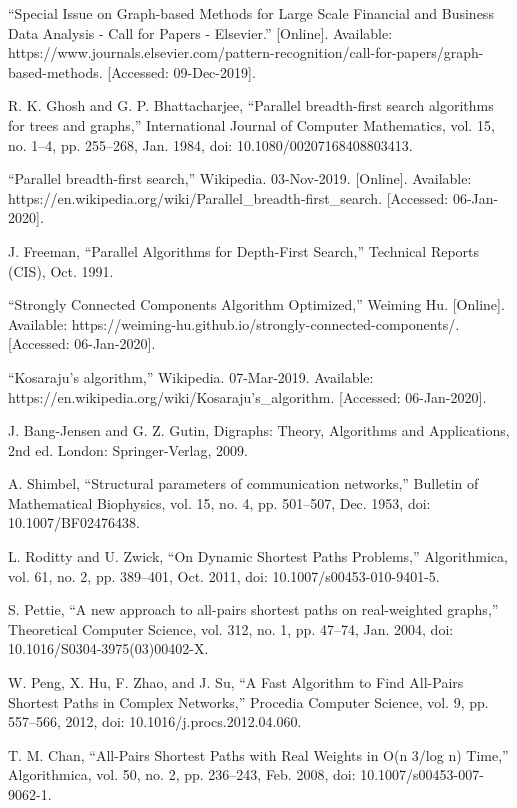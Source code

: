 \documentclass[journal,twoside,web]{ieeecolor}
\begin{document}
\begin{thebibliography}{9}
    “Special Issue on Graph-based Methods for Large Scale Financial and Business Data Analysis - Call for Papers - Elsevier.” [Online]. Available: https://www.journals.elsevier.com/pattern-recognition/call-for-papers/graph-based-methods. [Accessed: 09-Dec-2019].
    
     R. K. Ghosh and G. P. Bhattacharjee, “Parallel breadth-first search algorithms for trees and graphs,” International Journal of Computer Mathematics, vol. 15, no. 1–4, pp. 255–268, Jan. 1984, doi: 10.1080/00207168408803413.

     “Parallel breadth-first search,” Wikipedia. 03-Nov-2019. [Online]. Available: https://en.wikipedia.org/wiki/Parallel{\_}breadth-first{\_}search. [Accessed: 06-Jan-2020].

     J. Freeman, “Parallel Algorithms for Depth-First Search,” Technical Reports (CIS), Oct. 1991.

     “Strongly Connected Components Algorithm Optimized,” Weiming Hu. [Online]. Available: https://weiming-hu.github.io/strongly-connected-components/. [Accessed: 06-Jan-2020].

     “Kosaraju’s algorithm,” Wikipedia. 07-Mar-2019.  Available: https://en.wikipedia.org/wiki/Kosaraju's{\_}algorithm. [Accessed: 06-Jan-2020].

     J. Bang-Jensen and G. Z. Gutin, Digraphs: Theory, Algorithms and Applications, 2nd ed. London: Springer-Verlag, 2009.

     A. Shimbel, “Structural parameters of communication networks,” Bulletin of Mathematical Biophysics, vol. 15, no. 4, pp. 501–507, Dec. 1953, doi: 10.1007/BF02476438.

     L. Roditty and U. Zwick, “On Dynamic Shortest Paths Problems,” Algorithmica, vol. 61, no. 2, pp. 389–401, Oct. 2011, doi: 10.1007/s00453-010-9401-5.

     S. Pettie, “A new approach to all-pairs shortest paths on real-weighted graphs,” Theoretical Computer Science, vol. 312, no. 1, pp. 47–74, Jan. 2004, doi: 10.1016/S0304-3975(03)00402-X.

     W. Peng, X. Hu, F. Zhao, and J. Su, “A Fast Algorithm to Find All-Pairs Shortest Paths in Complex Networks,” Procedia Computer Science, vol. 9, pp. 557–566, 2012, doi: 10.1016/j.procs.2012.04.060.

     T. M. Chan, “All-Pairs Shortest Paths with Real Weights in O(n 3/log n) Time,” Algorithmica, vol. 50, no. 2, pp. 236–243, Feb. 2008, doi: 10.1007/s00453-007-9062-1.


\end{thebibliography}
\end{document}
